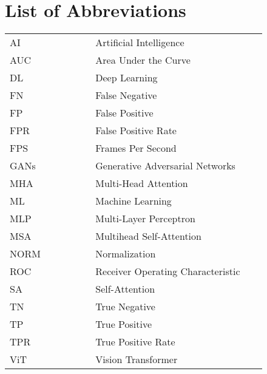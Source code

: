 \section*{List of Abbreviations}
\begin{table}[h]
  
    \renewcommand{\arraystretch}{1.5}
    \begin{tabular}{@{}p{0.3\linewidth}p{0.6\linewidth}@{}}
        AI   & Artificial Intelligence           \\
        AUC  & Area Under the Curve              \\
        DL   & Deep Learning                     \\
        FN   & False Negative                    \\
        FP   & False Positive                    \\
        FPR  & False Positive Rate               \\
        FPS  & Frames Per Second                 \\
        GANs & Generative Adversarial Networks   \\
        MHA  & Multi-Head Attention              \\
        ML   & Machine Learning                  \\
        MLP  & Multi-Layer Perceptron            \\
        MSA  & Multihead Self-Attention          \\
        NORM & Normalization                     \\
        ROC  & Receiver Operating Characteristic \\
        SA   & Self-Attention                    \\
        TN   & True Negative                     \\
        TP   & True Positive                     \\
        TPR  & True Positive Rate                \\
        ViT  & Vision Transformer                \\
    \end{tabular}
\end{table}

